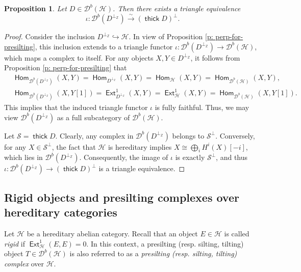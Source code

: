 \documentclass[12pt,a4paper,reqno]{amsart}
\newtheorem{proposition}[theorem]{Proposition}
\theoremstyle{definition}
\newcommand{\opname}[1]{\operatorname{\mathsf{#1}}}
\newcommand{\der}{\cd}
\newcommand{\thick}{\opname{thick}}
\newcommand{\Hom}{\opname{Hom}}
\newcommand{\Ext}{\opname{Ext}}
\newcommand{\cd}{{\mathcal D}}
\begin{document}
\begin{proposition}\label{p:identification-subcategory}
    Let $D\in \der^b(\mathcal{H})$. Then there exists a triangle equivalence
\[\iota : \der^b(D^{\perp_{\mathbb{Z}}}) \xrightarrow{\sim} (\thick{D})^\perp.\]
\end{proposition}
\begin{proof}
    Consider the inclusion $D^{\perp_{\mathbb{Z}}} \hookrightarrow \mathcal{H}$. In view of Proposition \ref{p: perp-for-presilting}, this inclusion extends to a triangle functor $\iota : \der^b(D^{\perp_{\mathbb{Z}}}) \to \der^b(\mathcal{H})$, which maps a complex to itself. For any objects $X, Y \in D^{\perp_{\mathbb{Z}}}$, it follows from Proposition \ref{p: perp-for-presilting} that
\begin{align*}
&\Hom_{\der^b(D^{\perp_{\mathbb{Z}}})} (X, Y) = \Hom_{D^{\perp_{\mathbb{Z}}}} (X, Y) = \Hom_{\mathcal{H}} (X, Y) = \Hom_{\der^b(\mathcal{H})} (X, Y),\\
&\Hom_{\der^b(D^{\perp_{\mathbb{Z}}})} (X, Y[1]) = \Ext_{D^{\perp_{\mathbb{Z}}}}^1 (X, Y) = \Ext_{\mathcal{H}}^1 (X, Y) = \Hom_{\der^b(\mathcal{H})} (X, Y[1]).
\end{align*}
This implies that the induced triangle functor $\iota$ is fully faithful. Thus, we may view $\der^b(D^{\perp_{\mathbb{Z}}})$ as a full subcategory of $\der^b(\mathcal{H})$.

Let $\mathcal{S} = \thick{D}$. Clearly, any complex in $\der^b(D^{\perp_{\mathbb{Z}}})$ belongs to $\mathcal{S}^{\perp}$. Conversely, for any $X \in \mathcal{S}^{\perp}$, the fact that $\mathcal{H}$ is hereditary implies $X \cong \bigoplus_i H^i(X)[-i]$, which lies in $\der^b(D^{\perp_{\mathbb{Z}}})$.  Consequently, the image of $\iota$ is exactly $\mathcal{S}^\perp$, and thus $\iota : \der^b(D^{\perp_{\mathbb{Z}}}) \to (\thick{D})^\perp$ is a triangle equivalence.
\end{proof}


\subsection{Rigid objects and presilting complexes over hereditary categories}
Let $\mathcal{H}$ be a hereditary abelian category. Recall that an object $E \in \mathcal{H}$ is called \emph{rigid} if $\Ext_{\mathcal{H}}^1 (E, E) = 0$. In this context,
a presilting (resp. silting, tilting) object $T\in \der^b(\mathcal{H})$ is also referred to as a {\em presilting (resp. silting, tilting) complex} over $\mathcal{H}$. 
\end{document}

